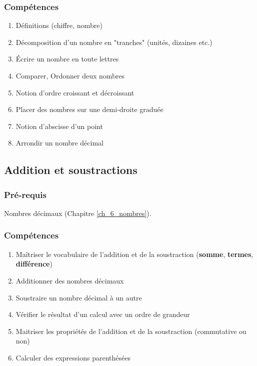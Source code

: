 \subsubsection*{Compétences}
\begin{enumerate}
	\item Définitions (chiffre, nombre)
	\item Décomposition d'un nombre en "tranches" (unités, dizaines etc.)
	\item \'Ecrire un nombre en toute lettres
	\item Comparer, Ordonner deux nombres
	\item Notion d'ordre croissant et décroissant
	\item Placer des nombres sur une demi-droite graduée
	\item Notion d'abscisse d'un point
	\item Arrondir un nombre décimal		
	
\end{enumerate}


\subsection{Addition et soustractions}\label{ch_6_add}

\subsubsection*{Pré-requis}

Nombres décimaux (Chapitre \ref{ch_6_nombres}).

\subsubsection*{Compétences}

\begin{enumerate}
	\item Maîtriser le vocabulaire de l'addition et de la soustraction (\textbf{somme}, \textbf{termes}, \textbf{différence})
	\item Additionner des nombres décimaux
	\item Soustraire un nombre décimal à un autre
	\item Vérifier le résultat d'un calcul avec un ordre de grandeur
	\item Maitriser les propriétés de l'addition et de la soustraction (commutative ou non)
	\item Calculer des expressions parenthésées 
	
\end{enumerate}


